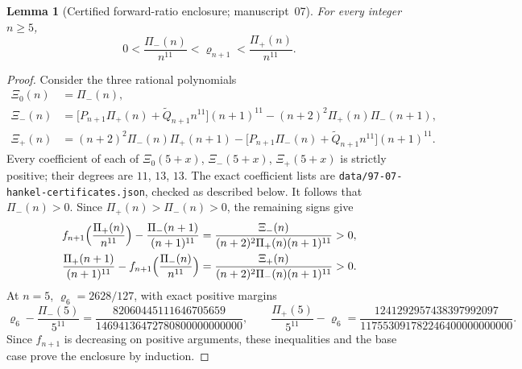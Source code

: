 \documentclass[11pt,letterpaper]{article}
\newcommand{\file}[1]{\nolinkurl{#1}}
\newtheorem{lemma}[theorem]{Lemma}
\theoremstyle{remark}\newtheorem{remark}[theorem]{Remark}
\newcounter{l7gtrsavedeq}
\begin{document}
\begin{lemma}[Certified forward-ratio enclosure; manuscript~07]\label{l7g:hp:lem:tight}
For every integer $n\ge5$,
\begin{equation}\label{l7g:hp:eq:tight}
 0<\frac{\Pi_-(n)}{n^{11}}<\varrho_{n+1}<\frac{\Pi_+(n)}{n^{11}}.
\end{equation}
\end{lemma}
\begin{proof}
Consider the three rational polynomials
\begin{align}
 \Xi_0(n)&=\Pi_-(n),\label{l7g:hp:eq:barriercert0}\\
 \Xi_-(n)&=\bigl[P_{n+1}\Pi_+(n)+\widetilde Q_{n+1}n^{11}\bigr](n+1)^{11}
          -(n+2)^2\Pi_+(n)\Pi_-(n+1),\label{l7g:hp:eq:barriercertminus}\\
 \Xi_+(n)&=(n+2)^2\Pi_-(n)\Pi_+(n+1)
          -\bigl[P_{n+1}\Pi_-(n)+\widetilde Q_{n+1}n^{11}\bigr](n+1)^{11}.
          \label{l7g:hp:eq:barriercertplus}
\end{align}
Every coefficient of each of $\Xi_0(5+x)$, $\Xi_-(5+x)$, $\Xi_+(5+x)$ is
strictly positive; their degrees are $11$, $13$, $13$. The exact coefficient
lists are \file{data/97-07-hankel-certificates.json}, checked as described
below. It follows that $\Pi_-(n)>0$. Since $\Pi_+(n)>\Pi_-(n)>0$, the
remaining signs give
\begin{align*}
 f_{n+1}\Bigl(\frac{\Pi_+(n)}{n^{11}}\Bigr)-\frac{\Pi_-(n+1)}{(n+1)^{11}}
 &=\frac{\Xi_-(n)}{(n+2)^2\Pi_+(n)(n+1)^{11}}>0,\\
 \frac{\Pi_+(n+1)}{(n+1)^{11}}-f_{n+1}\Bigl(\frac{\Pi_-(n)}{n^{11}}\Bigr)
 &=\frac{\Xi_+(n)}{(n+2)^2\Pi_-(n)(n+1)^{11}}>0.
\end{align*}
At $n=5$, $\varrho_6=2628/127$, with exact positive margins
\[
 \varrho_6-\frac{\Pi_-(5)}{5^{11}}=\frac{82060445111646705659}{14694136472780800000000000},
 \qquad
 \frac{\Pi_+(5)}{5^{11}}-\varrho_6=\frac{1241292957438397992097}{117553091782246400000000000}.
\]
Since $f_{n+1}$ is decreasing on positive arguments, these inequalities and
the base case prove the enclosure by induction.
\end{proof}
\end{document}

